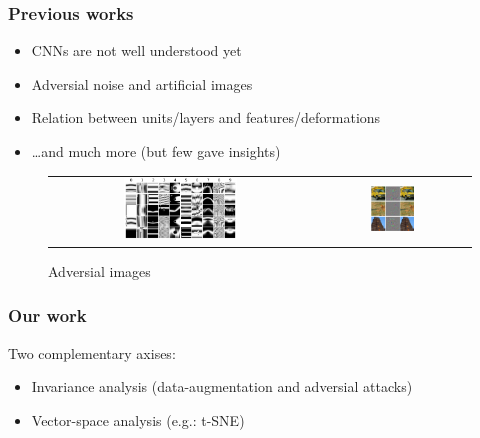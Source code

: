 \documentclass[10pt]{beamer}
\newcommand{\eg}{e.g.}
\begin{document}
\begin{frame}
    \frametitle{Previous works}
    \begin{itemize}
        \item CNNs are not well understood yet
        \item Adversial noise and artificial images
        \item Relation between units/layers and features/deformations
        \item \dots and much more (but few gave insights)
    \end{itemize}
    \begin{figure}[h]
        \begin{tabular}[]{cc}
            \includegraphics[width=0.45\textwidth]{midpres_figures/adversial_unrecogni.png}
            &
            \includegraphics[width=0.3\textwidth]{midpres_figures/adversial_imagenet.png}
        \end{tabular}
        \caption{Adversial images}
    \end{figure}
\end{frame}

\begin{frame}
    \frametitle{Our work}
    Two complementary axises:
    \begin{itemize}
        \item Invariance analysis (data-augmentation and adversial attacks)
        \item Vector-space analysis (\eg: t-SNE)
    \end{itemize}
\end{frame}
\end{document}
